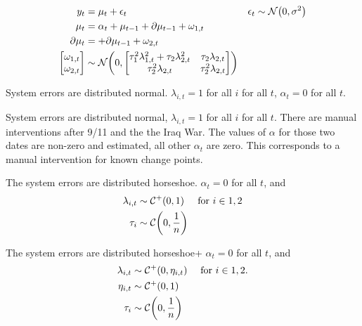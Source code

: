 \begin{equation}
  \label{dlm:eq:20}
  \begin{aligned}[t]
    y_{t} &= \mu_{t} + \epsilon_{t} & \epsilon_{t} & \sim \mathcal{N}\mathopen{}\left(0, \sigma^{2}\right)\mathclose{} \\
    \mu_{t} &= \alpha_{t} +  \mu_{t - 1} + \partial \mu_{t - 1} + \omega_{1, t} \\
    \partial \mu_{t} &= + \partial \mu_{t - 1} + \omega_{2, t} \\
    \begin{bmatrix}
      \omega_{1, t} \\
      \omega_{2, t}
    \end{bmatrix} &
                    \sim \mathcal{N}\mathopen{}\left(0,
                    \begin{bmatrix}
                      \tau_{1}^{2} \lambda_{1, t}^{2} + \tau_{2} \lambda_{2, t}^{2} & \tau_{2} \lambda_{2, t} \\
                      \tau_{2}^{2} \lambda_{2, t} & \tau_{2}^{2} \lambda_{2, t}
                    \end{bmatrix}
                    \right)\mathclose{}
  \end{aligned}
\end{equation}


\begin{description}[font = \normalfont\ModelII]
\item[Normal]
  System errors are distributed normal.
  $\lambda_{i, t} = 1$  for all $i$ for all $t$, $\alpha_{t} = 0$ for all $t$.
\item[Intervention]
  System errors are distributed normal, $\lambda_{i, t} = 1$  for all $i$ for all $t$.
  There are manual interventions after 9/11 and the the Iraq War. 
  The values of $\alpha$ for those two dates are non-zero and estimated, all other $\alpha_{t}$ are zero.
  This corresponds to a manual intervention for known change points.
\item[Horseshoe] The system errors are distributed horseshoe. $\alpha_{t} = 0$ for all $t$, and 
  \begin{equation}
    \label{dlm:eq:27}
    \begin{aligned}[t]
    \lambda_{i, t} & \sim \mathcal{C^+}\mathopen{}\left(0, 1\right)\mathclose{} & \text{for $i \in 1, 2$} \\
    \tau_{i} & \sim \mathcal{C}\mathopen{}\left(0, \frac{1}{n}\right)\mathclose{}
    \end{aligned}
  \end{equation}
\item[Horseshoe+] The system errors are distributed horseshoe+ $\alpha_{t}= 0$ for all $t$, and
  \begin{equation}
    \label{dlm:eq:25}
    \begin{aligned}
    \lambda_{i, t} & \sim \mathcal{C^+}\mathopen{}\left(0, \eta_{i, t}\right)\mathclose{} &&\text{  for $i \in 1, 2$.} \\
    \eta_{i, t} & \sim \mathcal{C^+}\mathopen{}\left(0, 1\right)\mathclose{} \\
    \tau_{i} & \sim \mathcal{C}\mathopen{}\left(0, \frac{1}{n}\right)\mathclose{}
    \end{aligned}
  \end{equation}
\end{description}


